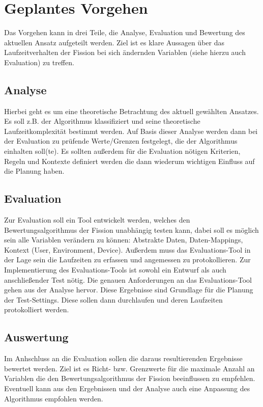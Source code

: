 \section{Geplantes Vorgehen}
Das Vorgehen kann in drei Teile, die Analyse, Evaluation und Bewertung des aktuellen Ansatz aufgeteilt werden. Ziel ist es klare Aussagen über das Laufzeitverhalten der Fission bei sich ändernden Variablen (siehe hierzu auch Evaluation) zu treffen.

\subsection{Analyse}
Hierbei geht es um eine theoretische Betrachtung des aktuell gewählten Ansatzes. Es soll z.B. der Algorithmus klassifiziert und seine theoretische Laufzeitkomplexität bestimmt werden. Auf Basis dieser Analyse werden dann bei der Evaluation zu prüfende Werte/Grenzen festgelegt, die der Algorithmus einhalten soll(te). Es sollten außerdem für die Evaluation nötigen Kriterien, Regeln und Kontexte definiert werden die dann wiederum wichtigen Einfluss auf die Planung haben.

\subsection{Evaluation}
Zur Evaluation soll ein Tool entwickelt werden, welches den Bewertungsalgorithmus der Fission unabhängig testen kann, dabei soll es möglich sein alle Variablen verändern zu können: Abstrakte Daten, Daten-Mappings, Kontext (User, Environment, Device). Außerdem muss das Evaluations-Tool in der Lage sein die Laufzeiten zu erfassen und angemessen zu protokollieren. Zur Implementierung des Evaluations-Tools ist sowohl ein Entwurf als auch anschließender Test nötig. Die genauen Anforderungen an das Evaluations-Tool gehen aus der Analyse hervor. Diese Ergebnisse sind Grundlage für die Planung der Test-Settings. Diese sollen dann durchlaufen und deren Laufzeiten protokolliert werden.


\subsection{Auswertung}
Im Anhschluss an die Evaluation sollen die daraus resultierenden Ergebnisse bewertet werden. Ziel ist es Richt- bzw. Grenzwerte für die maximale Anzahl an Variablen die den Bewertungsalgorithmus der Fission beeinflussen zu empfehlen.
Eventuell kann aus den Ergebnissen und der Analyse auch eine Anpassung  des Algorithmus empfohlen werden.



